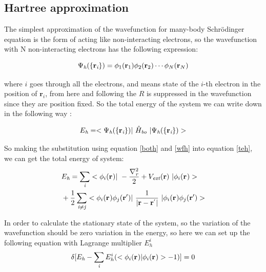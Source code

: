 \documentclass[a4paper]{report}
\begin{document}

\subsection{Hartree approximation}
\label{ha}
\noindent The simplest approximation of the wavefunction for many-body Schrödinger equation is the form of acting like non-interacting 
electrons, so the wavefunction with N non-interacting electrons has the following expression:

\begin{equation}\label{wfh}
\wfh = \bwf<1><1> \bwf<2><2> \cdots \bwf<N><N> 
\end{equation}

\noindent where $i$ goes through all the electrons, and  means state of the $i$-th electron in the position of ${\textbf{r}}_{\textit{i}}$, 
from here and following the $R$ is suppressed in the wavefunction since they are position fixed. So the total energy of the system we can write down in the following way :

\begin{equation}\label{teh}
E_{\textit{h}} = <\Psi_{\textit{h}}(\{\textbf{r}_{\textit{i}}\}) |\ {\hat{H}}_{\textit{bo}} \ | \Psi_{\textit{h}}(\{\textbf{r}_{\textit{i}}\})  >
\end{equation}

\noindent So making the substitution using equation \ref{both} and \ref{wfh} into equation \ref{teh}, we can get the total energy of system:
\begin{equation}\begin{split}
&E_\textit{h} = \sumi<i> <\bwf<i><> |\ -\frac{\nabla^{2}_{\textit r}}{2} + V_\textit{ext}(\textbf{r})  \ | \bwf<i><> > \\
& +\frac{1}{2} \suminj<i><j> <\bwf<i><> \bwfn<j><'>|\ \frac{1}{|\textbf{r} - \textbf{r}^{'} |} \ | \bwf<i><> \bwfn<j><'>>
\end{split}\end{equation}

\noindent In order to calculate the stationary state of the system, so the variation of the wavefunction should be
zero variation in the energy, so here we can set up the following equation with Lagrange multiplier $E^{i}_h$
\begin{equation}\label{haa}
 \delta [ E_{\textit{h}} - \sumi<i> E^{i}_{h} (<\bwf<i><> | \bwf<i><> > -1)] = 0 
\end{equation}
\end{document}

